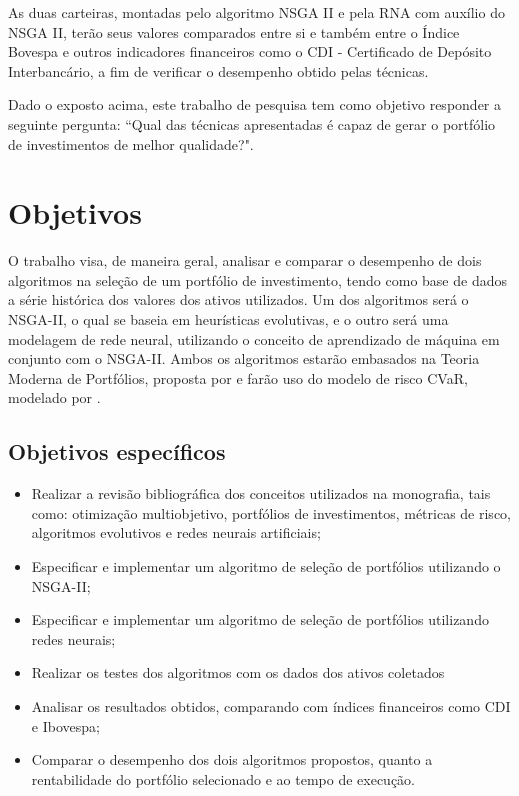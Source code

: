 \documentclass[11pt]{article}
\begin{document}
   As duas carteiras, montadas pelo algoritmo NSGA II e pela RNA com auxílio do NSGA II, terão seus valores comparados entre si e também entre o Índice Bovespa e outros indicadores financeiros como o CDI - Certificado de Depósito Interbancário, a fim de verificar o desempenho obtido pelas técnicas.
   
   Dado o exposto acima, este trabalho de pesquisa tem como objetivo responder a seguinte pergunta: ``Qual das técnicas apresentadas é capaz de gerar o portfólio de investimentos de melhor qualidade?".
   

\section{Objetivos}
\label{obj}

    O trabalho visa, de maneira geral, analisar e comparar o desempenho de dois algoritmos na seleção de um portfólio de investimento, tendo como base de dados a série histórica dos valores dos ativos utilizados. Um dos algoritmos será o NSGA-II, o qual se baseia em heurísticas evolutivas, e o outro será uma modelagem de rede neural, utilizando o conceito de aprendizado de máquina em conjunto com o NSGA-II. Ambos os algoritmos estarão embasados na Teoria Moderna de Portfólios, proposta por  e farão uso do modelo de risco CVaR, modelado por .
   
\subsection{Objetivos específicos}

\begin{itemize}
	\item Realizar a revisão bibliográfica dos conceitos utilizados na monografia, tais como: otimização multiobjetivo, portfólios de investimentos, métricas de risco, algoritmos evolutivos e redes neurais artificiais;
	\item Especificar e implementar um algoritmo de seleção de portfólios utilizando o NSGA-II;
    \item Especificar e implementar um algoritmo de seleção de portfólios utilizando redes neurais;
    \item Realizar os testes dos algoritmos com os dados dos ativos coletados
    \item Analisar os resultados obtidos, comparando com índices financeiros como CDI e Ibovespa;
    \item Comparar o desempenho dos dois algoritmos propostos, quanto a rentabilidade do portfólio selecionado e ao tempo de execução.
\end{itemize}
\end{document}
